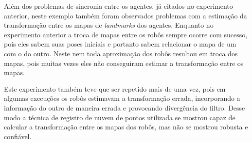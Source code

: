 Além dos problemas de sincronia entre os agentes, já citados no experimento 
anterior, neste exemplo também foram observados problemas com a estimação 
da transformação entre os mapas de \textit{landmarks} dos agentes. 
Enquanto no experimento anterior a troca de mapas entre os robôs sempre 
ocorre com sucesso, pois eles sabem suas poses iniciais e portanto sabem 
relacionar o mapa de um com o do outro. Neste nem toda aproximação dos 
robôs resultou em troca dos mapas, pois muitas vezes eles não conseguiram 
estimar a transformação entre os mapas.

Este experimento também teve que ser repetido mais de uma vez, pois em 
algumas execuções os robôs estimavam a transformação errada, incorporando 
a informação do outro de maneira errada e provocando divergência do 
filtro. Desse modo a técnica de registro de nuvem de pontos utilizada 
se mostrou capaz de calcular a transformação entre os mapas dos robôs, 
mas não se mostrou robusta e confiável.

